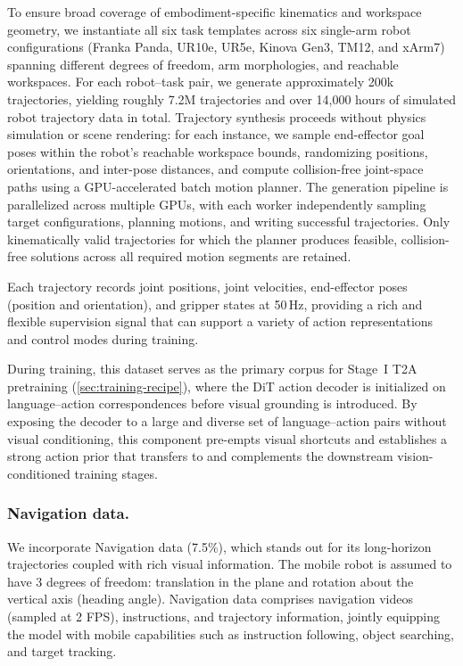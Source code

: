 \documentclass{article}
\begin{document}
To ensure broad coverage of embodiment-specific kinematics and workspace geometry, we instantiate all six task templates across six single-arm robot configurations (Franka Panda, UR10e, UR5e, Kinova Gen3, TM12, and xArm7) spanning different degrees of freedom, arm morphologies, and reachable workspaces. For each robot--task pair, we generate approximately 200k trajectories, yielding roughly 7.2M trajectories and over 14,000 hours of simulated robot trajectory data in total. Trajectory synthesis proceeds without physics simulation or scene rendering: for each instance, we sample end-effector goal poses within the robot's reachable workspace bounds, randomizing positions, orientations, and inter-pose distances, and compute collision-free joint-space paths using a GPU-accelerated batch motion planner. The generation pipeline is parallelized across multiple GPUs, with each worker independently sampling target configurations, planning motions, and writing successful trajectories. Only kinematically valid trajectories for which the planner produces feasible, collision-free solutions across all required motion segments are retained.

Each trajectory records joint positions, joint velocities, end-effector poses (position and orientation), and gripper states at 50\,Hz, providing a rich and flexible supervision signal that can support a variety of action representations and control modes during training.

During training, this dataset serves as the primary corpus for Stage~I T2A pretraining (\cref{sec:training-recipe}), where the DiT action decoder is initialized on language--action correspondences before visual grounding is introduced. By exposing the decoder to a large and diverse set of language--action pairs without visual conditioning, this component pre-empts visual shortcuts and establishes a strong action prior that transfers to and complements the downstream vision-conditioned training stages.

\subsubsection{Navigation data.}

We incorporate Navigation data (7.5\%), which stands out for its long-horizon trajectories coupled with rich visual information. The mobile robot is assumed to have 3 degrees of freedom: translation in the plane and rotation about the vertical axis (heading angle). Navigation data comprises navigation videos (sampled at 2 FPS), instructions, and trajectory information, jointly equipping the model with mobile capabilities such as instruction following, object searching, and target tracking.
\end{document}
